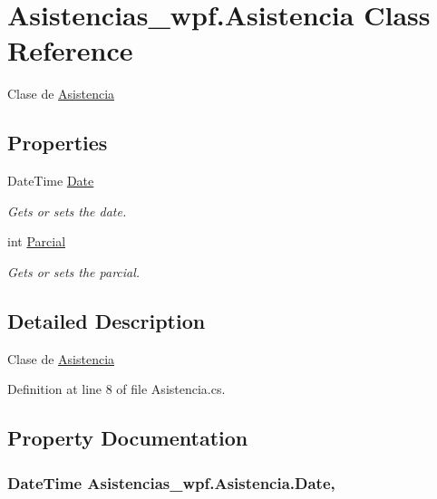 \hypertarget{class_asistencias__wpf_1_1_asistencia}{\section{Asistencias\-\_\-wpf.\-Asistencia Class Reference}
\label{class_asistencias__wpf_1_1_asistencia}
}


Clase de \hyperlink{class_asistencias__wpf_1_1_asistencia}{Asistencia}  


\subsection*{Properties}
\begin{DoxyCompactItemize}
\item 
Date\-Time \hyperlink{class_asistencias__wpf_1_1_asistencia_af356237cdb7d3557d9a0829b9081ad09}{Date}
\begin{DoxyCompactList}\small\item\em Gets or sets the date. \end{DoxyCompactList}\item 
int \hyperlink{class_asistencias__wpf_1_1_asistencia_a96e386adc754b6dff8756e27ba0fdbf8}{Parcial}
\begin{DoxyCompactList}\small\item\em Gets or sets the parcial. \end{DoxyCompactList}\end{DoxyCompactItemize}


\subsection{Detailed Description}
Clase de \hyperlink{class_asistencias__wpf_1_1_asistencia}{Asistencia} 



Definition at line 8 of file Asistencia.\-cs.



\subsection{Property Documentation}
\hypertarget{class_asistencias__wpf_1_1_asistencia_af356237cdb7d3557d9a0829b9081ad09}{
\subsubsection[{Date}]{\setlength{\rightskip}{0pt plus 5cm}Date\-Time Asistencias\-\_\-wpf.\-Asistencia.\-Date\hspace{0.3cm}{\ttfamily [get]}, {\ttfamily [set]}}}\label{class_asistencias__wpf_1_1_asistencia_af356237cdb7d3557d9a0829b9081ad09}


